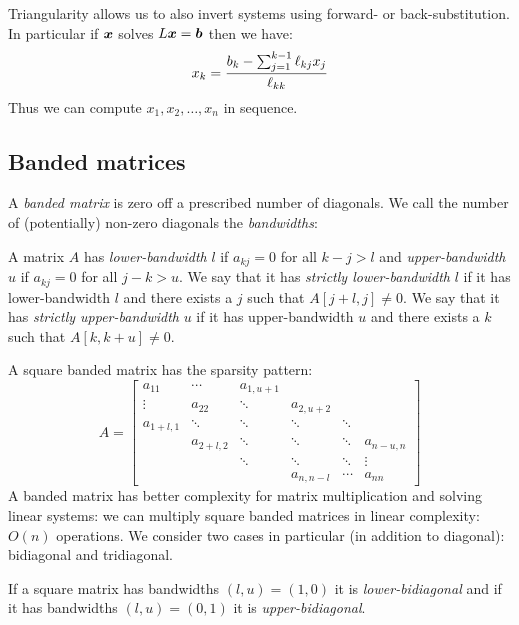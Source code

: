 Triangularity allows us to also invert systems using forward- or back-substitution. In particular if $\bm{{\mbox{\boldmath$x$\unboldmath}}}$ solves $L \bm{{\mbox{\boldmath$x$\unboldmath}}} = \bm{{\mbox{\boldmath$b$\unboldmath}}}$ then we have:
\[
x_k = {b_k - \ensuremath{\sum}_{j=1}^{k-1} \ensuremath{\ell}_{kj} x_j \over \ensuremath{\ell}_{kk}}
\]
Thus we can compute $x_1,x_2,\ensuremath{\ldots},x_n$ in sequence.

\subsection{Banded matrices}
A \emph{banded matrix} is zero off a prescribed number of diagonals. We call the number of (potentially) non-zero diagonals the \emph{bandwidths}:

\begin{definition}[bandwidths] A matrix $A$ has \emph{lower-bandwidth} $l$ if $a_{kj} = 0$ for all $k-j > l$ and \emph{upper-bandwidth} $u$ if $a_{kj} = 0$ for all $j-k > u$. We say that it has \emph{strictly lower-bandwidth} $l$ if it has lower-bandwidth $l$ and there exists a $j$ such that $A[j+l,j] \neq 0$. We say that it has \emph{strictly upper-bandwidth} $u$ if it has upper-bandwidth $u$ and there exists a $k$ such that $A[k,k+u] \neq 0$. \end{definition}

A square banded matrix has the sparsity pattern:
\[
A = \begin{bmatrix}
a_{11} & \ensuremath{\cdots} & a_{1,u+1} \\
\ensuremath{\vdots} & a_{22} & \ensuremath{\ddots} &  a_{2,u+2} \\
a_{1+l,1} & \ensuremath{\ddots} & \ensuremath{\ddots} & \ensuremath{\ddots} & \ensuremath{\ddots} \\
& a_{2+l,2} & \ensuremath{\ddots} & \ensuremath{\ddots} &  \ensuremath{\ddots} & a_{n-u,n} \\
&& \ensuremath{\ddots} & \ensuremath{\ddots} & \ensuremath{\ddots} & \ensuremath{\vdots} \\
&&& a_{n,n-l} & \ensuremath{\cdots} & a_{nn}
\end{bmatrix}
\]
A banded matrix has better complexity for matrix multiplication and solving linear systems:  we can multiply square banded matrices in linear complexity: $O(n)$ operations. We consider two cases in particular (in addition to diagonal): bidiagonal and tridiagonal.

\begin{definition}[Bidiagonal] If a square matrix has bandwidths $(l,u) = (1,0)$ it is \emph{lower-bidiagonal} and if it has bandwidths $(l,u) = (0,1)$ it is \emph{upper-bidiagonal}. \end{definition}

